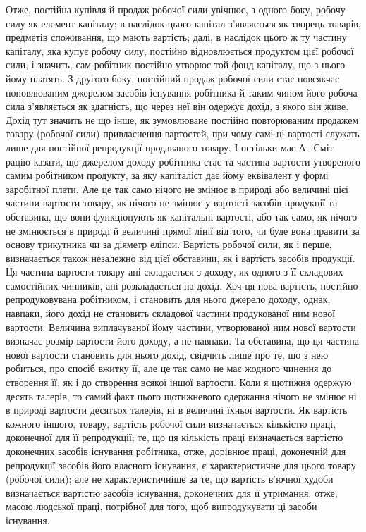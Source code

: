 Отже, постійна купівля й продаж робочої сили увічнює, з одного
боку, робочу силу як елемент капіталу; в наслідок цього капітал з’являється
як творець товарів, предметів споживання, що мають вартість;
далі, в наслідок цього ж ту частину капіталу, яка купує робочу силу, постійно
відновлюється продуктом цієї робочої сили, і значить, сам робітник постійно
утворює той фонд капіталу, що з нього йому платять. З другого
боку, постійний продаж робочої сили стає повсякчас поновлюваним джерелом
засобів існування робітника й таким чином його робоча сила
з’являється як здатність, що через неї він одержує дохід, з якого він
живе. Дохід тут значить не що інше, як зумовлюване постійно повторюваним
продажем товару (робочої сили) привласнення вартостей, при
чому самі ці вартості служать лише для постійної репродукції продаваного
товару. І остільки має А.~Сміт рацію казати, що джерелом доходу
робітника стає та частина вартости утвореного самим робітником продукту, за
яку капіталіст дає йому еквівалент у формі заробітної плати. Але це так
само нічого не змінює в природі або величині цієї частини вартости товару,
як нічого не змінює у вартості засобів продукції та обставина, що
вони функціонують як капітальні вартості, або так само, як нічого не
змінюється в природі й величині прямої лінії від того, чи буде вона правити
за основу трикутника чи за діяметр еліпси. Вартість робочої сили,
як і перше, визначається також незалежно від цієї обставини, як і вартість
засобів продукції. Ця частина вартости товару ані складається з доходу,
як одного з її складових самостійних чинників, ані розкладається на
дохід. Хоч ця нова вартість, постійно репродуковувана робітником, і становить
для нього джерело доходу, однак, навпаки, його дохід не становить
складової частини продукованої ним нової вартости. Величина виплачуваної
йому частини, утворюваної ним нової вартости визначає розмір
вартости його доходу, а не навпаки. Та обставина, що ця частина нової
вартости становить для нього дохід, свідчить лише про те, що з нею робиться,
про спосіб вжитку її, але це так само не має жодного чинення до створення
її, як і до створення всякої іншої вартости. Коли я щотижня
одержую десять талерів, то самий факт цього щотижневого одержання
нічого не змінює ні в природі вартости десятьох талерів, ні в величині
їхньої вартости. Як вартість кожного іншого, товару, вартість робочої
сили визначається кількістю праці, доконечної для її репродукції; те, що
ця кількість праці визначається вартістю доконечних засобів існування
робітника, отже, дорівнює праці, доконечній для репродукції засобів його
власного існування, є характеристичне для цього товару (робочої сили);
але не характеристичніше за те, що вартість в’ючної худоби визначається
вартістю засобів існування, доконечних для її утримання, отже,
масою людської праці, потрібної для того, щоб випродукувати ці засоби
існування.

